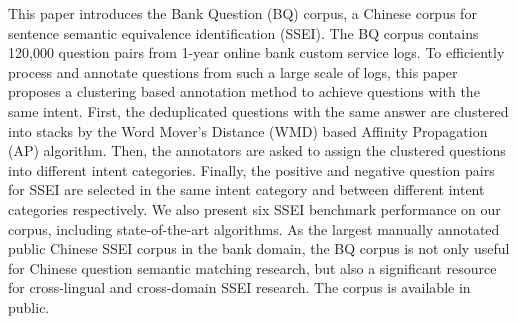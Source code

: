 This paper introduces the Bank Question (BQ) corpus, a Chinese corpus for sentence semantic equivalence identification (SSEI). The BQ corpus contains 120,000 question pairs from 1-year online bank custom service logs. To efficiently process and annotate questions from such a large scale of logs, this paper proposes a clustering based annotation method to achieve questions with the same intent. First, the deduplicated questions with the same answer are clustered into stacks by the Word Mover's Distance (WMD) based Affinity Propagation (AP) algorithm. Then, the annotators are asked to assign the clustered questions into different intent categories. Finally, the positive and negative question pairs for SSEI are selected in the same intent category and between different intent categories respectively. We also present six SSEI benchmark performance on our corpus, including state-of-the-art algorithms. As the largest manually annotated public Chinese SSEI corpus in the bank domain, the BQ corpus is not only useful for Chinese question semantic matching research, but also a significant resource for cross-lingual and cross-domain SSEI research. The corpus is available in public.
